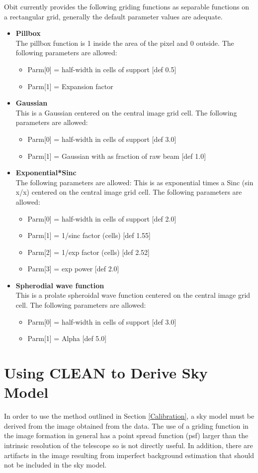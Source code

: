 \documentclass[11pt]{report}
\begin{document}
Obit currently provides the following griding functions as separable
functions on a rectangular grid, generally the default parameter
values are adequate.
\begin{itemize}
\item {\bf Pillbox}\\
The pillbox function is 1 inside the area of the pixel and 0 outside.
The following parameters are allowed:
\begin{itemize}
\item  Parm[0] = half-width in cells of support [def 0.5]
\item  Parm[1] = Expansion factor
\end{itemize}
\item {\bf Gaussian} \\
This is a Gaussian centered on the central image grid cell.
The following parameters are allowed:
\begin{itemize}
\item  Parm[0] = half-width in cells of support [def 3.0]
\item  Parm[1] = Gaussian with as fraction of raw beam [def 1.0]
\end{itemize}
\item {\bf Exponential*Sinc}\\
The following parameters are allowed:
This is as exponential times a Sinc (sin x/x) centered on the central
image grid cell. 
The following parameters are allowed:
\begin{itemize}
\item Parm[0] = half-width in cells of support [def 2.0]
\item Parm[1] = 1/sinc factor (cells) [def 1.55]
\item Parm[2] = 1/exp factor (cells) [def 2.52]
\item Parm[3] = exp power [def 2.0]
\end{itemize}
\item {\bf Spherodial wave function}\\
This is a prolate spheroidal wave function centered on the central
image grid cell. 
The following parameters are allowed:
\begin{itemize}
\item  Parm[0] = half-width in cells of support [def 3.0]
\item  Parm[1] = Alpha [def 5.0]
\end{itemize}
\end{itemize}


\section{Using CLEAN to Derive Sky Model}
In order to use the method outlined in Section \ref{Calibration}, a sky
model must be derived from the image obtained from the data.
The use of a griding function in the image formation in general has a
point spread function (psf) larger than the intrinsic resolution of
the telescope so is not directly useful.
In addition, there are artifacts in the image resulting from imperfect
background estimation that should not be included in the sky model.
\end{document}
